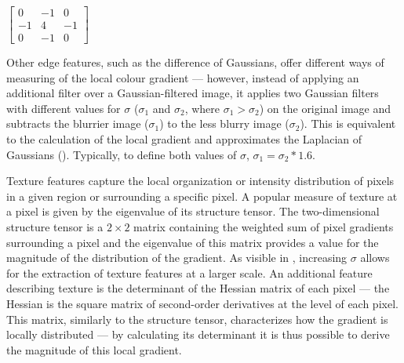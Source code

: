 \begin{center}
    $\begin{bmatrix}0 & -1 & 0\\-1 & 4 & -1\\0 & -1 & 0\end{bmatrix}$
\end{center}

\begin{figure}[!ht]
	\label{fig:segmentation-example-edges}
\end{figure}

Other edge features, such as the difference of Gaussians, offer different ways of measuring of the local colour gradient --- however, instead of applying an additional filter over a Gaussian-filtered image, it applies two Gaussian filters with different values for $\sigma$ ($\sigma_1$ and $\sigma_2$, where $\sigma_1 > \sigma_2$) on the original image and subtracts the blurrier image ($\sigma_1$) to the less blurry image ($\sigma_2$). This is equivalent to the calculation of the local gradient and approximates the Laplacian of Gaussians \cite{Bundy1984-uu} (). Typically, to define both values of $\sigma$, $\sigma_1 = \sigma_2 * 1.6$.

Texture features capture the local organization or intensity distribution of pixels in a given region or surrounding a specific pixel. A popular measure of texture at a pixel is given by the eigenvalue of its structure tensor. The two-dimensional structure tensor is a $2 \times 2$ matrix containing the weighted sum of pixel gradients surrounding a pixel and the eigenvalue of this matrix provides a value for the magnitude of the distribution of the gradient. As visible in , increasing $\sigma$ allows for the extraction of texture features at a larger scale. An additional feature describing texture is the determinant of the Hessian matrix of each pixel --- the Hessian is the square matrix of second-order derivatives at the level of each pixel. This matrix, similarly to the structure tensor, characterizes how the gradient is locally distributed --- by calculating its determinant it is thus possible to derive the magnitude of this local gradient.

